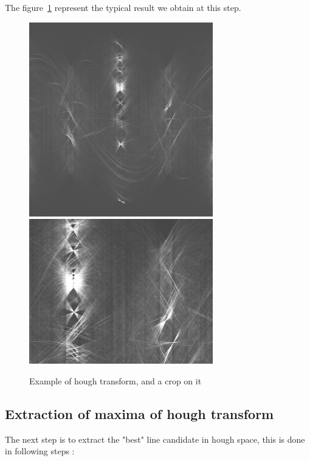 The figure~\ref{Fig:Line:Hough} represent the typical  result  we obtain at this step.

\begin{figure}
\centering
        \includegraphics[width=8cm]{Methods/ImagesFils/FullHough.jpg}
        \includegraphics[width=8cm]{Methods/ImagesFils/Crop-Hough.jpg}
        \caption{Example of hough transform, and a crop on it}
\label{Fig:Line:Hough}
\end{figure}



\subsection{Extraction of maxima of hough transform}

\label{Hough:Max:Loc}

The next step is to extract the "best" line candidate in hough space, 
this is done in  following steps :

